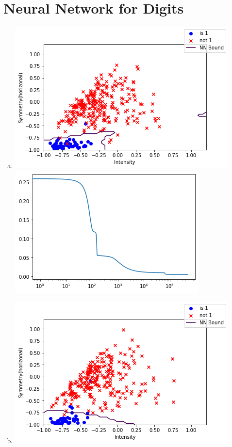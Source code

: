 \documentclass{article}
\begin{document}
\section{Neural Network for Digits}

\begin{enumerate}[a)]
    \item \includegraphics[]{2/42} \\ \includegraphics[]{2/21}
    \item \includegraphics[]{2/62}

\end{enumerate}
\end{document}
